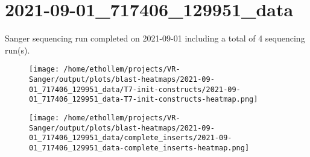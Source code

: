 \section{2021-09-01\_717406\_129951\_data}

    Sanger sequencing run completed on 2021-09-01
    including a total of 4 sequencing
    run(s).
    

    \begin{figure}[!h]
        \texttt{[image: /home/ethollem/projects/VR-Sanger/output/plots/blast-heatmaps/2021-09-01\_717406\_129951\_data/T7-init-constructs/2021-09-01\_717406\_129951\_data-T7-init-constructs-heatmap.png]}
        \centering
    \end{figure}


    \begin{figure}[!h]
        \texttt{[image: /home/ethollem/projects/VR-Sanger/output/plots/blast-heatmaps/2021-09-01\_717406\_129951\_data/complete\_inserts/2021-09-01\_717406\_129951\_data-complete\_inserts-heatmap.png]}
        \centering
    \end{figure}

\pagebreak